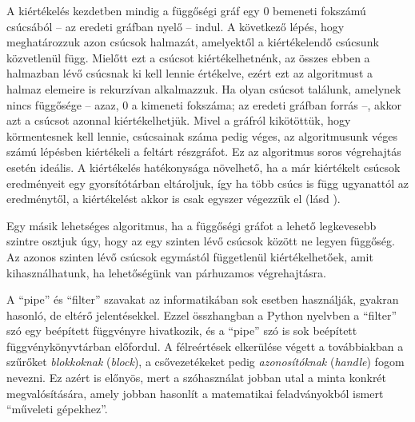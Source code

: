 A kiértékelés kezdetben mindig a függőségi gráf egy 0 bemeneti fokszámú csúcsából -- az eredeti gráfban nyelő -- indul.
A következő lépés, hogy meghatározzuk azon csúcsok halmazát, amelyektől a kiértékelendő csúcsunk közvetlenül függ.
Mielőtt ezt a csúcsot kiértékelhetnénk, az összes ebben a halmazban lévő csúcsnak ki kell lennie értékelve, ezért ezt az algoritmust a halmaz elemeire is rekurzívan alkalmazzuk.
Ha olyan csúcsot találunk, amelynek nincs függősége -- azaz, 0 a kimeneti fokszáma; az eredeti gráfban forrás --, akkor azt a csúcsot azonnal kiértékelhetjük.
Mivel a gráfról kikötöttük, hogy körmentesnek kell lennie, csúcsainak száma pedig véges, az algoritmusunk véges számú lépésben kiértékeli a feltárt részgráfot.
Ez az algoritmus soros végrehajtás esetén ideális.
A kiértékelés hatékonysága növelhető, ha a már kiértékelt csúcsok eredményeit egy gyorsítótárban eltároljuk, így ha több csúcs is függ ugyanattól az eredménytől, a kiértékelést akkor is csak egyszer végezzük el (lásd \cite{wiki:Memoization}).

Egy másik lehetséges algoritmus, ha a függőségi gráfot a lehető legkevesebb szintre osztjuk úgy, hogy az egy szinten lévő csúcsok között ne legyen függőség.
Az azonos szinten lévő csúcsok egymástól függetlenül kiértékelhetőek, amit kihasználhatunk, ha lehetőségünk van párhuzamos végrehajtásra.

A ``pipe'' és ``filter'' szavakat az informatikában sok esetben használják, gyakran hasonló, de eltérő jelentésekkel.
Ezzel összhangban a Python nyelvben a ``filter'' szó egy beépített függvényre hivatkozik, és a ``pipe'' szó is sok beépített függvénykönyvtárban előfordul.
A félreértések elkerülése végett a továbbiakban a szűrőket \textit{blokkoknak} (\textit{block}), a csővezetékeket pedig \textit{azonosítóknak} (\textit{handle}) fogom nevezni.
Ez azért is előnyös, mert a szóhasználat jobban utal a minta konkrét megvalósítására, amely jobban hasonlít a matematikai feladványokból ismert ``műveleti gépekhez''.


